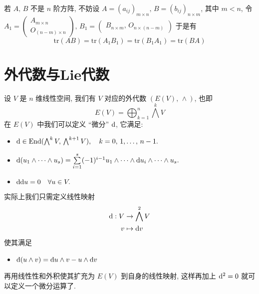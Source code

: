\documentclass{book}
\newcommand{\md}{{\rm d}}
\begin{document}
        若 $A,\,B$ 不是 $n$ 阶方阵, 不妨设 $A = (a_{ij})_{m\times n},\,B = (b_{ij})_{n\times m}$, 其中 $m<n$,
        令 $A_1 = \begin{pmatrix}
            A_{m\times n} \\ O_{(n-m)\times n}
        \end{pmatrix},\,B_1 = \begin{pmatrix}
            B_{n\times m},\,O_{n\times(n-m)}
        \end{pmatrix}$
        于是有
        \begin{equation*}
            \mathrm{tr}(AB) = \mathrm{tr}(A_1B_1) = \mathrm{tr}(B_1A_1) = \mathrm{tr}(BA)
        \end{equation*}

    \section{外代数与Lie代数}
        设 $V$ 是 $n$ 维线性空间, 我们有 $V$ 对应的外代数 $(E(V),\,\wedge)$, 也即
        \begin{equation*}
            E(V) = \bigoplus_{k=1}^{n}\bigwedge^{k}V
        \end{equation*}
        在 $E(V)$ 中我们可以定义 “微分” $\md$, 它满足:
        \begin{itemize}
            \item $\md\in{\rm End}(\bigwedge^{k}V,\,\bigwedge^{k+1}V),\quad k=0,\,1,\dots,\,n-1.$
            \item $\md(u_1\wedge\cdots\wedge u_s) = \sum\limits_{i = 1}^{s}(-1)^{i-1}u_1\wedge\cdots\wedge \md u_i\wedge\cdots\wedge u_s.$
            \item $\md\md u = 0\quad \forall u\in V.$
        \end{itemize}
        实际上我们只需定义线性映射
        \begin{align*}
            \md:V&\rightarrow\bigwedge^2V\\
            v&\mapsto\md v
        \end{align*}
        使其满足
        \begin{itemize}
            \item $\md(u\wedge v) = \md u\wedge v-u\wedge\md v$
        \end{itemize}
        再用线性性和外积使其扩充为 $E(V)$ 到自身的线性映射, 这样再加上 $\md^2 = 0$ 就可以定义一个微分运算了.
\end{document}
